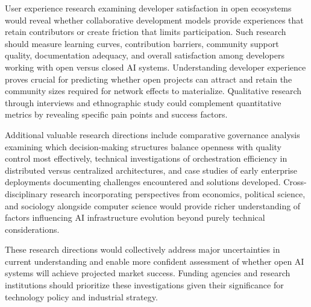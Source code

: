 User experience research examining developer satisfaction in open ecosystems would reveal whether collaborative development models provide experiences that retain contributors or create friction that limits participation. Such research should measure learning curves, contribution barriers, community support quality, documentation adequacy, and overall satisfaction among developers working with open versus closed AI systems. Understanding developer experience proves crucial for predicting whether open projects can attract and retain the community sizes required for network effects to materialize. Qualitative research through interviews and ethnographic study could complement quantitative metrics by revealing specific pain points and success factors.

Additional valuable research directions include comparative governance analysis examining which decision-making structures balance openness with quality control most effectively, technical investigations of orchestration efficiency in distributed versus centralized architectures, and case studies of early enterprise deployments documenting challenges encountered and solutions developed. Cross-disciplinary research incorporating perspectives from economics, political science, and sociology alongside computer science would provide richer understanding of factors influencing AI infrastructure evolution beyond purely technical considerations.

These research directions would collectively address major uncertainties in current understanding and enable more confident assessment of whether open AI systems will achieve projected market success. Funding agencies and research institutions should prioritize these investigations given their significance for technology policy and industrial strategy.
